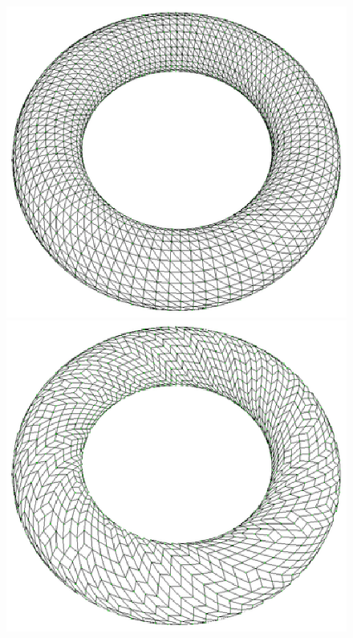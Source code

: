 \documentclass[11pt, a4paper]{paper}
\begin{document}
{\begin{figure}
\includegraphics[scale=0.33]{torus1.eps}
\includegraphics[scale=0.33]{torus2.eps}

\end{figure}}
\end{document}
